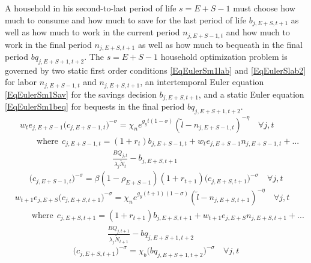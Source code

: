\documentclass[letterpaper,12pt]{article}
\theoremstyle{definition}
\begin{document}
\begin{spacing}{1.5}
    A household in his second-to-last period of life $s=E+S-1$ must choose how much to consume and how much to save for the last period of life $b_{j,E+S,t+1}$ as well as how much to work in the current period $n_{j,E+S-1,t}$ and how much to work in the final period $n_{j,E+S,t+1}$ as well as how much to bequeath in the final period $bq_{j,E+S+1,t+2}$. The $s=E+S-1$ household optimization problem is governed by two static first order conditions \eqref{EqEulerSm1lab} and \eqref{EqEulerSlab2} for labor  $n_{j,E+S-1,t}$ and $n_{j,E+S,t+1}$, an intertemporal Euler equation \eqref{EqEulerSm1Sav} for the savings decision $b_{j,E+S,t+1}$, and a static Euler equation \eqref{EqEulerSm1beq} for bequests in the final period $bq_{j,E+S+1,t+2}$.
    \begin{equation}\label{EqEulerSm1lab}
      \begin{split}
        &w_t e_{j,E+S-1}\bigl(c_{j,E+S-1,t}\bigr)^{-\sigma} = \chi_n e^{g_y t(1-\sigma)}(\tilde{l} - n_{j,E+S-1,t})^{-\eta} \quad\forall j,t \\
        &\quad\quad\text{where}\:\: c_{j,E+S-1,t} = \left(1+r_t\right)b_{j,E+S-1,t} + w_t e_{j,E+S-1}n_{j,E+S-1,t} + ... \\
        &\quad\quad\quad\quad\quad\quad\quad\quad\quad\quad\quad \frac{BQ_{j,t}}{\lambda_j\tilde{N}_t} - b_{j,E+S,t+1}
      \end{split}
    \end{equation}
    \begin{equation}\label{EqEulerSm1Sav}
      \bigl(c_{j,E+S-1,t}\bigr)^{-\sigma} = \beta(1-\rho_{E+S-1})(1+r_{t+1})\bigl(c_{j,E+S,t+1}\bigr)^{-\sigma} \quad\forall j,t
    \end{equation}
    \begin{equation}\label{EqEulerSlab2}
      \begin{split}
        &w_{t+1}e_{j,E+S}\bigl(c_{j,E+S,t+1}\bigr)^{-\sigma} = \chi_n e^{g_y(t+1)(1-\sigma)}(\tilde{l} - n_{j,E+S,t+1})^{-\eta} \quad\forall j,t \\
        &\quad\quad\text{where}\:\: c_{j,E+S,t+1} = \left(1+r_{t+1}\right)b_{j,E+S,t+1} + w_{t+1} e_{j,E+S}n_{j,E+S,t+1} + ... \\
        &\quad\quad\quad\quad\quad\quad\quad\quad\quad\quad\quad \frac{BQ_{j,t+1}}{\lambda_j\tilde{N}_{t+1}} - bq_{j,E+S+1,t+2}
      \end{split}
    \end{equation}
    \begin{equation}\label{EqEulerSm1beq}
      \bigl(c_{j,E+S,t+1}\bigr)^{-\sigma} = \chi_b\bigl(bq_{j,E+S+1,t+2}\bigr)^{-\sigma} \quad\forall j,t
    \end{equation}


\end{spacing}
\end{document}
